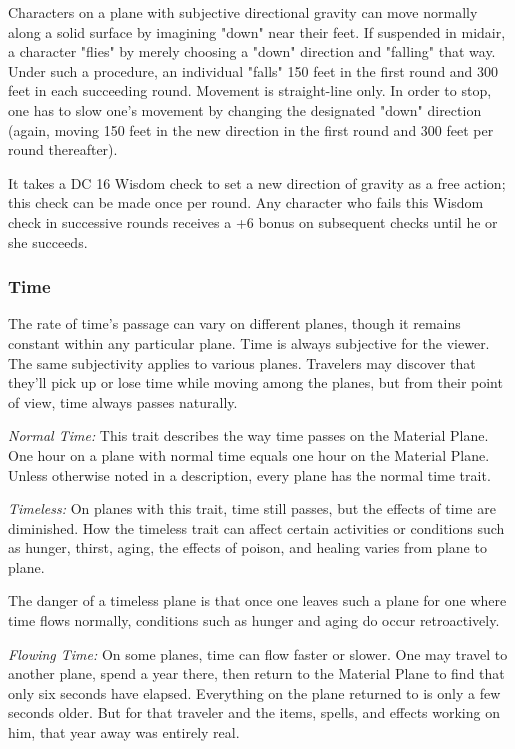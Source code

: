 Characters on a plane with subjective directional gravity can move normally along 
a solid surface by imagining "down" near their feet. If suspended in midair, 
a character "flies" by merely choosing a "down" direction and "falling" that 
way. Under such a procedure, an individual "falls" 150 feet in the first round 
and 300 feet in each succeeding round. Movement is straight-line only. In order 
to stop, one has to slow one's movement by changing the designated "down" direction 
(again, moving 150 feet in the new direction in the first round and 300 feet per 
round thereafter).

It takes a DC 16 Wisdom check to set a new direction of gravity as a free action; 
this check can be made once per round. Any character who fails this Wisdom check 
in successive rounds receives a +6 bonus on subsequent checks until he or she succeeds.

\subsubsection{Time}

The rate of time's passage can vary on different planes, though 
it remains constant within any particular plane. Time is always subjective for 
the viewer. The same subjectivity applies to various planes. Travelers may discover 
that they'll pick up or lose time while moving among the planes, but from their 
point of view, time always passes naturally.

\textit{Normal Time:} This trait describes the way time passes on the Material 
Plane. One hour on a plane with normal time equals one hour on the Material Plane. 
Unless otherwise noted in a description, every plane has the normal time trait.

\textit{Timeless:} On planes with this trait, time still passes, but the effects 
of time are diminished. How the timeless trait can affect certain activities or 
conditions such as hunger, thirst, aging, the effects of poison, and healing varies 
from plane to plane.

The danger of a timeless plane is that once one leaves such a plane for one where 
time flows normally, conditions such as hunger and aging do occur retroactively. 

\textit{Flowing Time:} On some planes, time can flow faster or slower. One may 
travel to another plane, spend a year there, then return to the Material Plane 
to find that only six seconds have elapsed. Everything on the plane returned to 
is only a few seconds older. But for that traveler and the items, spells, and effects 
working on him, that year away was entirely real.

